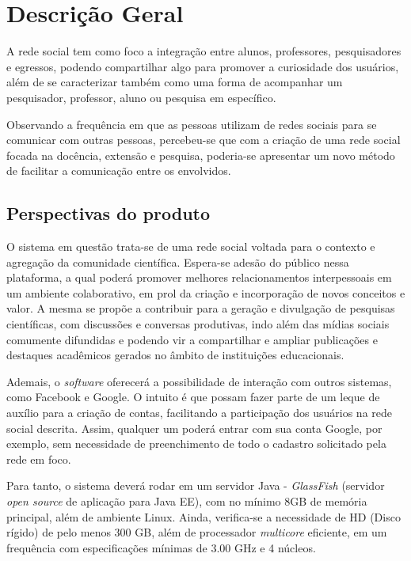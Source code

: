 \chapter{Descrição Geral}
A rede social tem como foco a integração entre alunos, professores, pesquisadores e egressos, 
podendo compartilhar algo para promover a curiosidade dos usuários, além de se caracterizar também como uma forma de acompanhar um pesquisador, professor, aluno ou pesquisa em específico. 	

Observando a frequência em que as pessoas utilizam de redes sociais para se comunicar com outras pessoas, percebeu-se que com a criação de uma rede social focada na docência, extensão e pesquisa, poderia-se apresentar um novo método de facilitar a comunicação entre os envolvidos. 


\section{Perspectivas do produto}

O sistema em questão trata-se de uma rede social voltada para o contexto e agregação da comunidade científica. Espera-se adesão do público nessa plataforma, a qual poderá promover melhores relacionamentos interpessoais em um ambiente colaborativo, em prol da criação e incorporação de novos conceitos e valor. A mesma se propõe a contribuir para a geração e divulgação de pesquisas científicas, com discussões e conversas produtivas, indo além das mídias sociais comumente difundidas e podendo vir a compartilhar e ampliar publicações e destaques acadêmicos gerados no âmbito de instituições educacionais.

Ademais, o \textit{software} oferecerá a possibilidade de interação com outros sistemas, como Facebook e Google. O intuito é que possam fazer parte de um leque de auxílio para a criação de contas, facilitando a participação dos usuários na rede social descrita. Assim, qualquer um poderá entrar com sua conta Google, por exemplo, sem necessidade de preenchimento de todo o cadastro solicitado pela rede em foco.

Para tanto, o sistema deverá rodar em um servidor Java - \textit{GlassFish} (servidor \textit{open source} de aplicação para Java EE), com no mínimo 8GB de memória principal, além de ambiente Linux. Ainda, verifica-se a necessidade de HD (Disco rígido) de pelo menos 300 GB, além de processador \textit{multicore} eficiente, em um frequência com especificações mínimas de 3.00 GHz e 4 núcleos. 


